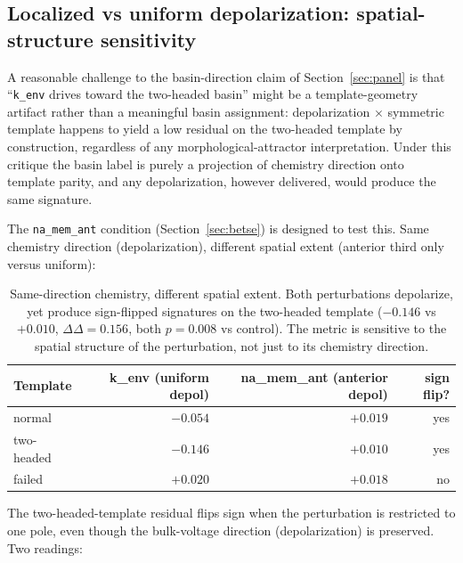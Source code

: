 \documentclass[11pt,a4paper]{article}
\begin{document}
\subsection{Localized vs uniform depolarization: spatial-structure sensitivity}\label{sec:localized}

A reasonable challenge to the basin-direction claim of Section~\ref{sec:panel} is that ``\texttt{k\_env} drives toward the two-headed basin'' might be a template-geometry artifact rather than a meaningful basin assignment: depolarization $\times$ symmetric template happens to yield a low residual on the two-headed template by construction, regardless of any morphological-attractor interpretation. Under this critique the basin label is purely a projection of chemistry direction onto template parity, and any depolarization, however delivered, would produce the same signature.

The \texttt{na\_mem\_ant} condition (Section~\ref{sec:betse}) is designed to test this. Same chemistry direction (depolarization), different spatial extent (anterior third only versus uniform):

\begin{table}[h]\centering\small
\caption{Same-direction chemistry, different spatial extent. Both perturbations depolarize, yet produce sign-flipped signatures on the two-headed template ($-0.146$ vs $+0.010$, $\Delta\Delta=0.156$, both $p=0.008$ vs control). The metric is sensitive to the spatial structure of the perturbation, not just to its chemistry direction.}\label{tab:localized}
\begin{tabular}{lrrr}\toprule
Template     & k\_env (uniform depol) & na\_mem\_ant (anterior depol) & sign flip? \\
\midrule
normal       & $-0.054$  & $+0.019$ & yes \\
two-headed   & $\mathbf{-0.146}$ & $\mathbf{+0.010}$ & yes \\
failed       & $+0.020$ & $+0.018$ & no \\
\bottomrule\end{tabular}
\end{table}

The two-headed-template residual flips sign when the perturbation is restricted to one pole, even though the bulk-voltage direction (depolarization) is preserved. Two readings:
\end{document}
